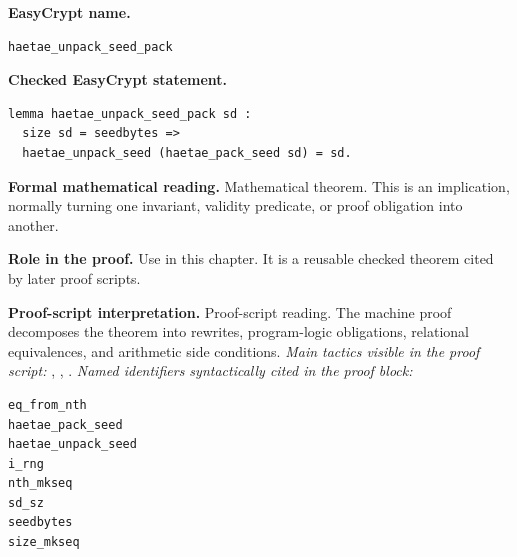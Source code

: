 \begin{formaltheorem}
\noindent\textbf{EasyCrypt name.}
\begin{lstlisting}[language=EasyCrypt,basicstyle=\ttfamily\scriptsize]
haetae_unpack_seed_pack
\end{lstlisting}
\noindent\textbf{Checked EasyCrypt statement.}
\begin{lstlisting}[language=EasyCrypt,basicstyle=\ttfamily\scriptsize]
lemma haetae_unpack_seed_pack sd :
  size sd = seedbytes =>
  haetae_unpack_seed (haetae_pack_seed sd) = sd.
\end{lstlisting}
\noindent\textbf{Formal mathematical reading.}
Mathematical theorem. This is an implication, normally turning one invariant, validity predicate, or proof obligation into another.

\noindent\textbf{Role in the proof.}
Use in this chapter. It is a reusable checked theorem cited by later proof scripts.

\noindent\textbf{Proof-script interpretation.}
Proof-script reading. The machine proof decomposes the theorem into rewrites, program-logic obligations, relational equivalences, and arithmetic side conditions.
\emph{Main tactics visible in the proof script:} , , .
\emph{Named identifiers syntactically cited in the proof block:}
\begin{lstlisting}[language=EasyCrypt,basicstyle=\ttfamily\scriptsize]
eq_from_nth
haetae_pack_seed
haetae_unpack_seed
i_rng
nth_mkseq
sd_sz
seedbytes
size_mkseq
\end{lstlisting}

\end{formaltheorem}

